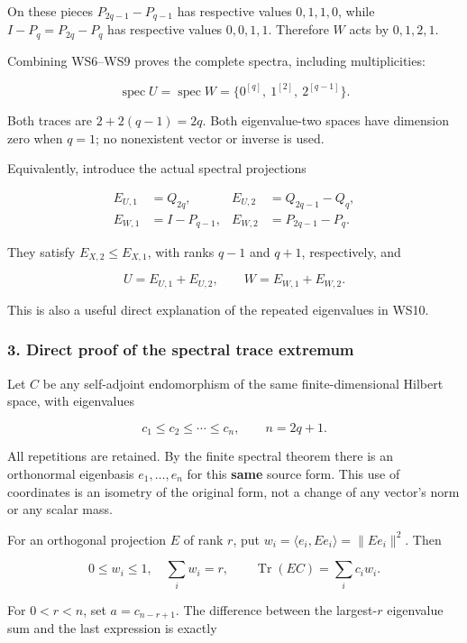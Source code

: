 On these pieces \(P_{2q-1}-P_{q-1}\) has respective values \(0,1,1,0\), while \(I-P_q=P_{2q}-P_q\) has respective values \(0,0,1,1\). Therefore \(W\) acts by \(0,1,2,1\).

Combining WS6--WS9 proves the complete spectra, including multiplicities:

\[
\boxed{\quad
\operatorname{spec}U=\operatorname{spec}W
=\{0^{[q]},\ 1^{[2]},\ 2^{[q-1]}\}.
\quad}
\tag{WS10}
\]

Both traces are \(2+2(q-1)=2q\). Both eigenvalue-two spaces have dimension zero when \(q=1\); no nonexistent vector or inverse is used.

Equivalently, introduce the actual spectral projections

\[
\begin{aligned}
E_{U,1}&=Q_{2q},&E_{U,2}&=Q_{2q-1}-Q_q,\\
E_{W,1}&=I-P_{q-1},&E_{W,2}&=P_{2q-1}-P_q.
\end{aligned}
\tag{WS11}
\]

They satisfy \(E_{X,2}\le E_{X,1}\), with ranks \(q-1\) and \(q+1\), respectively, and

\[
U=E_{U,1}+E_{U,2},\qquad
W=E_{W,1}+E_{W,2}.
\tag{WS12}
\]

This is also a useful direct explanation of the repeated eigenvalues in WS10.

\subsubsection{3. Direct proof of the spectral trace extremum}\label{endpoint-window_review--direct-proof-of-the-spectral-trace-extremum}

Let \(C\) be any self-adjoint endomorphism of the same finite-dimensional Hilbert space, with eigenvalues

\[
c_1\le c_2\le\cdots\le c_n,
\qquad n=2q+1.
\tag{WS13}
\]

All repetitions are retained. By the finite spectral theorem there is an orthonormal eigenbasis \(e_1,\ldots,e_n\) for this \textbf{same} source form. This use of coordinates is an isometry of the original form, not a change of any vector's norm or any scalar mass.

For an orthogonal projection \(E\) of rank \(r\), put \(w_i=\langle e_i,Ee_i\rangle=\|Ee_i\|^2\). Then

\[
0\le w_i\le1,\quad\sum_iw_i=r,
\qquad\operatorname{Tr}(EC)=\sum_i c_iw_i.
\tag{WS14}
\]

For \(0<r<n\), set \(a=c_{n-r+1}\). The difference between the largest-\(r\) eigenvalue sum and the last expression is exactly

